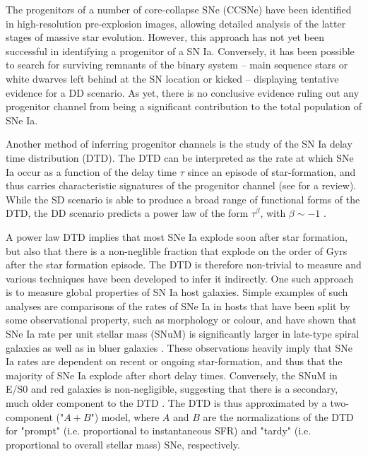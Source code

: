 \documentclass[fleqn,usenatbib]{mnras}
\begin{document}
The progenitors of a number of core-collapse SNe (CCSNe) have been identified in high-resolution pre-explosion images, allowing detailed analysis of the latter stages of massive star evolution. However, this approach has not yet been successful in identifying a progenitor of a SN Ia. Conversely, it has been possible to search for surviving remnants of the binary system -- main sequence stars or white dwarves left behind at the SN location or kicked \citep{Shen2018} -- displaying tentative evidence for a DD scenario. As yet, there is no conclusive evidence ruling out any progenitor channel from being a significant contribution to the total population of SNe Ia.

Another method of inferring progenitor channels is the study of the SN Ia delay time distribution (DTD). The DTD can be interpreted as the rate at which SNe Ia occur as a function of the delay time $\tau$ since an episode of star-formation, and thus carries characteristic signatures of the progenitor channel (see \citealt{Wang2012} for a review). While the SD scenario is able to produce a broad range of functional forms of the DTD, the DD scenario predicts a power law of the form $\tau^{\beta}$, with $\beta \sim -1$ \citep[e.g][]{Ruiter2009,Mennekens2010}.

A power law DTD implies that most SNe Ia explode soon after star formation, but also that there is a non-neglible fraction that explode on the order of Gyrs after the star formation episode. The DTD is therefore non-trivial to measure and various techniques have been developed to infer it indirectly. One such approach is to measure global properties of SN Ia host galaxies. Simple examples of such analyses are comparisons of the rates of SNe Ia in hosts that have been split by some observational property, such as morphology or colour, and have shown that SNe Ia rate per unit stellar mass (SNuM) is significantly larger in late-type spiral galaxies as well as in bluer galaxies \citep[e.g.][]{Mannucci2005}. These observations heavily imply that SNe Ia rates are dependent on recent or ongoing star-formation, and thus that the majority of SNe Ia explode after short delay times. Conversely, the SNuM in E/S0 and red galaxies is non-negligible, suggesting that there is a secondary, much older component to the DTD \citep{Sullivan2006,Smith2012}. The DTD is thus approximated by a two-component ("$A + B$") model, where $A$ and $B$ are the normalizations of the DTD for "prompt" (i.e. proportional to instantaneous SFR) and "tardy" (i.e. proportional to overall stellar mass) SNe, respectively.
\end{document}
